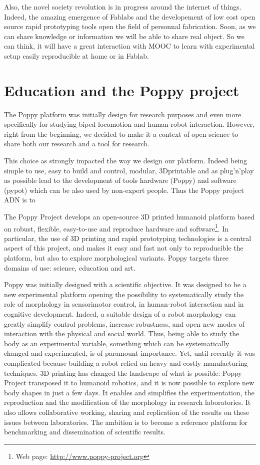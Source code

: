 Also, the novel society revolution is in progress around the internet of things. Indeed, the amazing emergence of Fablabs and the developement of low cost open source rapid prototyping tools open the field of personnal fabrication. Soon, as we can share knowledge or information we will be able to share real object. So we can think, it will have a great interaction with MOOC to learn with experimental setup easily reproducible at home or in Fablab.


\section{Education and the Poppy project} %

The Poppy platform was initially design for research purposes and even more specifically for studying biped locomotion and human-robot interaction. However, right from the beginning, we decided to make it a context of open science to share both our research and a tool for research.

This choice as strongly impacted the way we design our platform. Indeed being simple to use, easy to build and control, modular, 3Dprintable and as plug'n'play as possible lead to the development of tools hardware (Poppy) and software (pypot) which can be also used by non-expert people. Thus the Poppy project ADN is to



The Poppy Project develops an open-source 3D printed humanoid platform based on robust, flexible, easy-to-use and reproduce hardware and software\footnote{Web page: \url{http://www.poppy-project.org}}. In particular, the use of 3D printing and rapid prototyping technologies is a central aspect of this project, and makes it easy and fast not only to reproducible the platform, but also to explore morphological variants. Poppy targets three domains of use: science, education and art.

Poppy was initially designed with a scientific objective. It was designed to be a new experimental platform opening the possibility to systematically study the role of morphology in sensorimotor control, in human-robot interaction and in cognitive development. Indeed, a suitable design of a robot morphology can greatly simplify control problems, increase robustness, and open new modes of interaction with the physical and social world. Thus, being able to study the body as an experimental variable, something which can be systematically changed and experimented, is of paramount importance. Yet, until recently it was complicated because building a robot relied on heavy and costly manufacturing techniques. 3D printing has changed the landscape of what is possible: Poppy Project transposed it to humanoid robotics, and it is now possible to explore new body shapes in just a few days. It enables and simplifies the experimentation, the reproduction and the modification of the morphology in research laboratories. It also allows collaborative working, sharing and replication of the results on these issues between laboratories. The ambition is to become a reference platform for benchmarking and dissemination of scientific results.

